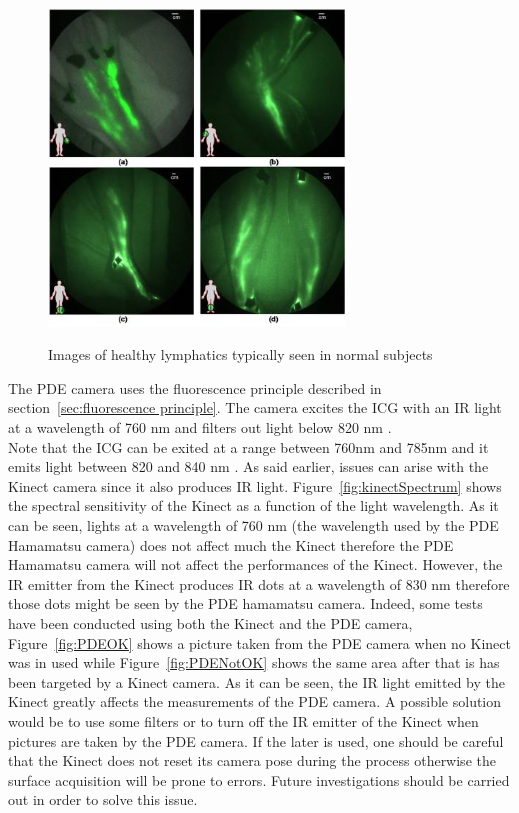 \begin{figure}
\caption{Images of healthy lymphatics typically seen in normal subjects}
\centering
    \includegraphics[width=0.7\textwidth]{images/imageICGLymph.png}
\label{fig:hamaResults0}
\end{figure}

The PDE camera uses the fluorescence principle described in section~\ref{sec:fluorescence principle}. The camera excites the ICG with an IR light at a wavelength of 760 nm \cite{tagaya_non-invasive_2010} and filters out light below 820 nm \cite{gotoh_novel_2009}. \\

Note that the ICG can be exited at a range between 760nm and 785nm and it emits light between 820 and 840 nm \cite{marshall_near-infrared_2010}. As said earlier, issues can arise with the Kinect camera since it also produces IR light. Figure~\ref{fig:kinectSpectrum} \cite{kolomenski_realization_2013} shows the spectral sensitivity of the Kinect as a function of the light wavelength. As it can be seen, lights at a wavelength of 760 nm (the wavelength used by the PDE Hamamatsu camera) does not affect much the Kinect therefore the PDE Hamamatsu camera will not affect the performances of the Kinect. However, the IR emitter from the Kinect produces IR dots at a wavelength of 830 nm \cite{kramer_introducing_2012} therefore those dots might be seen by the PDE hamamatsu camera. Indeed, some tests have been conducted using both the Kinect and the PDE camera, Figure~\ref{fig:PDEOK} shows a picture taken from the PDE camera when no Kinect was in used while Figure~\ref{fig:PDENotOK} shows the same area after that is has been targeted by a Kinect camera. As it can be seen, the IR light emitted by the Kinect greatly affects the measurements of the PDE camera. A possible solution would be to use some filters or to turn off the IR emitter of the Kinect when pictures are taken by the PDE camera. If the later is used, one should be careful that the Kinect does not reset its camera pose during the process otherwise the surface acquisition will be prone to errors. Future investigations should be carried out in order to solve this issue.\\
  
